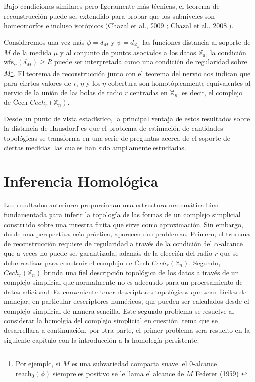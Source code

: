 Bajo condiciones similares pero ligeramente m\'as t\'ecnicas, el teorema de reconstrucci\'on puede ser
extendido para probar que los subniveles son homeomorfos e incluso isot\'opicos
(Chazal et al., 2009 \cite{Chazal2009c}; Chazal et al., 2008 \cite{Chazal2008}).

Consideremos una vez m\'as $\phi = d_{M}$ y $\psi = d_{\mathbb{X}_{n}}$ las funciones distancia
al soporte de $M$ de la medida $\mu$ y al conjunto de puntos asociados a los datos $\mathbb{X}_{n}$,
la condici\'on $\mathrm{wfs}_{\alpha}\left(d_{M}\right)\geq R$ puede ser interpretada como una
condici\'on de regularidad sobre $M$\footnote{Por ejemplo, si $M$ es una subvariedad compacta suave,
el $0$-alcance $\mathrm{reach}_{0}\left(\phi\right)$ siempre es positivo se le llama el alcance de
$M$ Federer (1959) \cite{Federer1959}}. El teorema de reconstrucci\'on junto con el teorema del nervio
nos indican que para ciertos valores de $r$, $\eta$ y los $\eta$-cobertura son homot\'opicamente
equivalentes al nervio de la uni\'on de las bolas de radio $r$ centradas en $\mathbb{X}_{n}$, es decir,
el complejo de \v Cech $Cech_{r}\left(\mathbb{X}_{n}\right)$.

Desde un punto de vista estad\'istico, la principal ventaja de estos resultados sobre la distancia de
Hausdorff es que el problema de estimaci\'on de cantidades topol\'ogicas se transforma en una serie
de preguntas acerca de el soporte de ciertas medidas, las cuales han sido ampliamente estudiadas.

\section{Inferencia Homol\'ogica}

Los resultados anteriores proporcionan una estructura matem\'atica bien fundamentada para inferir la
topolog\'ia de las formas de un complejo simplicial construido sobre una muestra finita que sirve como
aproximaci\'on. Sin embargo, desde una perspectiva m\'as pr\'actica, aparecen dos problemas. Primero, el
teorema de reconstrucci\'on requiere de regularidad a trav\'es de la condici\'on del $\alpha$-alcance
que a veces no puede ser garantizada, adem\'as de la elecci\'on del radio $r$ que se debe realizar para
construir el complejo de \v Cech $Cech_{r}\left(\mathbb{X}_{n}\right)$. Segundo,
$Cech_{r}\left(\mathbb{X}_{n}\right)$ brinda una fiel descripci\'on topol\'ogica de los datos a trav\'es
de un complejo simplicial que normalmente no es adecuado para un procesamiento de datos adicional. Es
conveniente tener descriptores topol\'ogicos que sean f\'aciles de manejar, en particular descriptores
num\'ericos, que pueden ser calculados desde el complejo simplicial de manera sencilla. Este segundo
problema se resuelve al considerar la homolg\'ia del complejo simplicial en cuesti\'on,
tema que se desarrollara a continuaci\'on, por otra parte, el primer problema sera resuelto
en la siguiente cap\'itulo con la introducci\'on a la homolog\'ia persistente.

